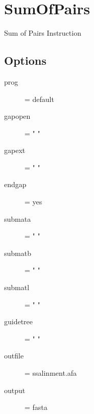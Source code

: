 \section{SumOfPairs}

Sum of Pairs Instruction

\subsection{Options}
\begin{description}
\item[prog] = default
\item[gapopen] = " "
\item[gapext] = " "
\item[endgap] = yes
\item[submata] = " " 
\item[submatb] = " " 
\item[submatl] = " " 
\item[guidetree] = " "
\item[outfile] = ssalinment.afa
\item[output] = fasta
\end{description}